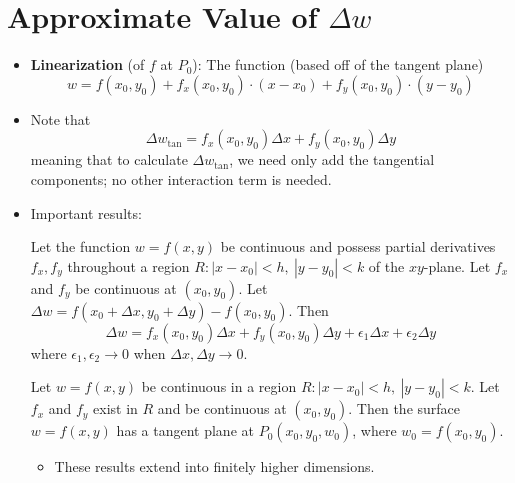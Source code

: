 \documentclass[../main.tex]{subfiles}
\begin{document}
\section{Approximate Value of \texorpdfstring{$\Delta w$}{TEXT}}
\begin{itemize}
    \item \textbf{Linearization} (of $f$ at $P_0$): The function (based off of the tangent plane)
    \begin{equation*}
        w = f(x_0,y_0)+f_x(x_0,y_0)\cdot(x-x_0)+f_y(x_0,y_0)\cdot(y-y_0)
    \end{equation*}
    \item Note that
    \begin{equation*}
        \Delta w_\text{tan} = f_x(x_0,y_0)\Delta x+f_y(x_0,y_0)\Delta y
    \end{equation*}
    meaning that to calculate $\Delta w_\text{tan}$, we need only add the tangential components; no other interaction term is needed.
    \item Important results:
    \begin{thm}\label{thm:deltaW}
        Let the function $w=f(x,y)$ be continuous and possess partial derivatives $f_x,f_y$ throughout a region $R:|x-x_0|<h,\ |y-y_0|<k$ of the $xy$-plane. Let $f_x$ and $f_y$ be continuous at $(x_0,y_0)$. Let $\Delta w = f(x_0+\Delta x,y_0+\Delta y)-f(x_0,y_0)$. Then
        \begin{equation*}
            \Delta w = f_x(x_0,y_0)\Delta x+f_y(x_0,y_0)\Delta y+\epsilon_1\Delta x+\epsilon_2\Delta y
        \end{equation*}
        where $\epsilon_1,\epsilon_2\to 0$ when $\Delta x,\Delta y\to 0$.
    \end{thm}
    \begin{cly}
        Let $w=f(x,y)$ be continuous in a region $R:|x-x_0|<h,\ |y-y_0|<k$. Let $f_x$ and $f_y$ exist in $R$ and be continuous at $(x_0,y_0)$. Then the surface $w=f(x,y)$ has a tangent plane at $P_0(x_0,y_0,w_0)$, where $w_0=f(x_0,y_0)$.
    \end{cly}
    \begin{itemize}
        \item These results extend into finitely higher dimensions.
    \end{itemize}
\end{itemize}
\end{document}
